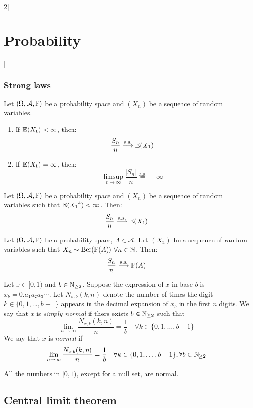 \documentclass[../../../main.tex]{subfiles}
\begin{document}
\begin{multicols}{2}[\section{Probability}]
  \subsubsection{Strong laws}
  \begin{theorem}
    Let $(\Omega,\mathcal{A},\mathbb{P})$ be a probability space and $(X_n)$ be a sequence of \iid random variables.
    \begin{enumerate}
      \item If $\mathbb{E}(X_1)<\infty$, then: $$\frac{S_n}{n}\overset{\text{a.s.}}{\longrightarrow}\mathbb{E}(X_1)$$
      \item If $\mathbb{E}(X_1)=\infty$, then: $$\limsup_{n\to\infty}\frac{|S_n|}{n}\overset{\text{a.s.}}{=}+\infty$$
    \end{enumerate}
  \end{theorem}
  \begin{theorem}
    Let $(\Omega,\mathcal{A},\mathbb{P})$ be a probability space and $(X_n)$ be a sequence of \iid random variables such that $\mathbb{E}({X_1}^4)<\infty$. Then: $$\frac{S_n}{n}\overset{\text{a.s.}}{\longrightarrow}\mathbb{E}(X_1)$$
  \end{theorem}
  \begin{corollary}
    Let $(\Omega,\mathcal{A},\mathbb{P})$ be a probability space, $A\in\mathcal{A}$. Let $(X_n)$ be a sequence of \iid random variables such that $X_n\sim\text{Ber}(\mathbb{P}(A))$ $\forall n\in\mathbb{N}$. Then: $$\frac{S_n}{n}\overset{\text{a.s.}}{\longrightarrow}\mathbb{P}(A)$$
  \end{corollary}
  \begin{definition}
    Let $x\in[0,1)$ and $b\in\mathbb{N}_{\geq 2}$. Suppose the expression of $x$ in base $b$ is $x_b=0.a_1a_2a_3\cdots$. Let $N_{x,b}(k,n)$ denote the number of times the digit $k\in\{0,1,\ldots,b-1\}$ appears in the decimal expansion of $x_b$ in the first $n$ digits. We say that $x$ is \emph{simply normal} if there exists $b\in\mathbb{N}_{\geq 2}$ such that $$\lim_{n\to\infty}\frac{N_{x,b}(k,n)}{n}=\frac{1}{b}\quad\forall k\in\{0,1,\ldots,b-1\}$$
    We say that $x$ is \emph{normal} if $$\lim_{n\to\infty}\frac{N_{x,b}(k,n)}{n}=\frac{1}{b}\quad\forall k\in\{0,1,\ldots,b-1\}, \forall b\in\mathbb{N}_{\geq 2}$$
  \end{definition}
  \begin{theorem}
    All the numbers in $[0,1)$, except for a null set, are normal.
  \end{theorem}
  \subsection{Central limit theorem}

\end{multicols}
\end{document}

